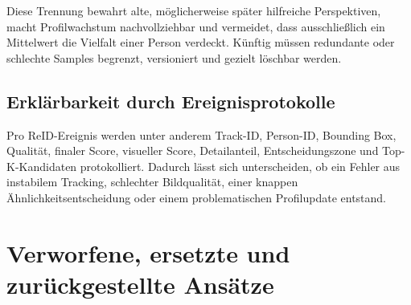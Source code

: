 Diese Trennung bewahrt alte, möglicherweise später hilfreiche Perspektiven,
macht Profilwachstum nachvollziehbar und vermeidet, dass ausschließlich ein
Mittelwert die Vielfalt einer Person verdeckt. Künftig müssen redundante oder
schlechte Samples begrenzt, versioniert und gezielt löschbar werden.

\subsection{Erklärbarkeit durch Ereignisprotokolle}

Pro ReID-Ereignis werden unter anderem Track-ID, Person-ID, Bounding Box,
Qualität, finaler Score, visueller Score, Detailanteil, Entscheidungszone und
Top-K-Kandidaten protokolliert. Dadurch lässt sich unterscheiden, ob ein Fehler
aus instabilem Tracking, schlechter Bildqualität, einer knappen
Ähnlichkeitsentscheidung oder einem problematischen Profilupdate entstand.


\section{Verworfene, ersetzte und zurückgestellte Ansätze}

